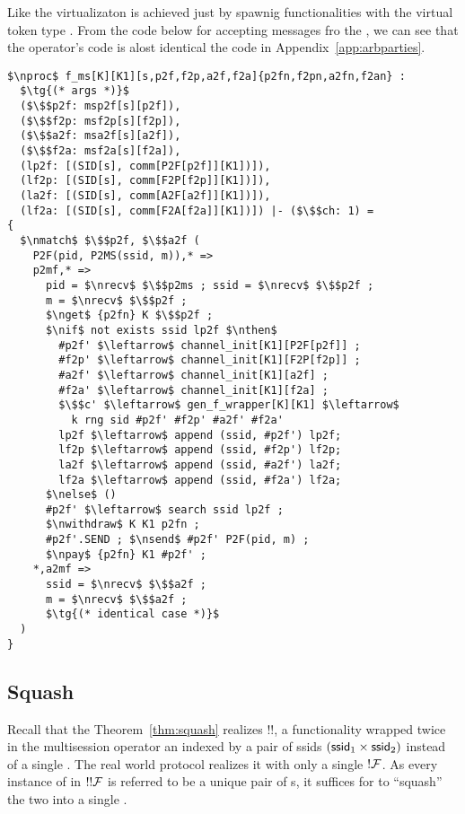 Like the \partywrapper virtualizaton is achieved just by spawnig functionalities with the virtual token type .
From the code below for accepting messages fro the \partywrapper, we can see that the operator's code is alost identical the code in Appendix~\ref{app:arbparties}.
\begin{lstlisting}[basicstyle=\footnotesize\BeraMonottFamily, frame=single, mathescape]
$\nproc$ f_ms[K][K1][s,p2f,f2p,a2f,f2a]{p2fn,f2pn,a2fn,f2an} :
  $\tg{(* args *)}$
  ($\$$p2f: msp2f[s][p2f]), 
  ($\$$f2p: msf2p[s][f2p]),
  ($\$$a2f: msa2f[s][a2f]), 
  ($\$$f2a: msf2a[s][f2a]),
  (lp2f: [(SID[s], comm[P2F[p2f]][K1])]), 
  (lf2p: [(SID[s], comm[F2P[f2p]][K1])]),
  (la2f: [(SID[s], comm[A2F[a2f]][K1])]), 
  (lf2a: [(SID[s], comm[F2A[f2a]][K1])]) |- ($\$$ch: 1) =
{
  $\nmatch$ $\$$p2f, $\$$a2f (
    P2F(pid, P2MS(ssid, m)),* =>
    p2mf,* => 
      pid = $\nrecv$ $\$$p2ms ; ssid = $\nrecv$ $\$$p2f ;
	  m = $\nrecv$ $\$$p2f ;
      $\nget$ {p2fn} K $\$$p2f ;
      $\nif$ not exists ssid lp2f $\nthen$
        #p2f' $\leftarrow$ channel_init[K1][P2F[p2f]] ;
        #f2p' $\leftarrow$ channel_init[K1][F2P[f2p]] ;
        #a2f' $\leftarrow$ channel_init[K1][a2f] ;
        #f2a' $\leftarrow$ channel_init[K1][f2a] ;
        $\$$c' $\leftarrow$ gen_f_wrapper[K][K1] $\leftarrow$ 
		  k rng sid #p2f' #f2p' #a2f' #f2a'
        lp2f $\leftarrow$ append (ssid, #p2f') lp2f; 
        lf2p $\leftarrow$ append (ssid, #f2p') lf2p;
        la2f $\leftarrow$ append (ssid, #a2f') la2f; 
        lf2a $\leftarrow$ append (ssid, #f2a') lf2a;
      $\nelse$ ()
      #p2f' $\leftarrow$ search ssid lp2f ;
      $\nwithdraw$ K K1 p2fn ;
      #p2f'.SEND ; $\nsend$ #p2f' P2F(pid, m) ; 
      $\npay$ {p2fn} K1 #p2f' ;
    *,a2mf => 
      ssid = $\nrecv$ $\$$a2f ;
      m = $\nrecv$ $\$$a2f ;
      $\tg{(* identical case *)}$
  )
}
\end{lstlisting}

\subsection{Squash} \label{sec:squash}
Recall that the Theorem~\ref{thm:squash} realizes !!\F, a functionality wrapped twice in the multisession operator an indexed by a pair of ssids $(\mathsf{ssid}_1 \times \mathsf{ssid}_2)$ instead of a single .
The real world protocol  realizes it with only a single $!\mathcal{F}$. 
As every instance of \F in $!!\mathcal{F}$ is referred to be a unique pair of s, it suffices for  to ``squash'' the two into a single .


